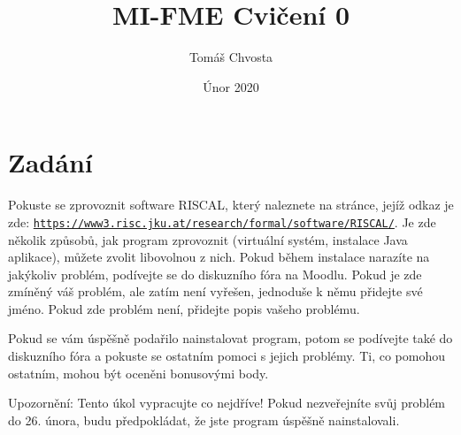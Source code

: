 \documentclass{article}
\title{MI-FME Cvičení 0}
\author{Tomáš Chvosta}
\date{Únor 2020}
\begin{document}
\maketitle

\section{Zadání}
Pokuste se zprovoznit software RISCAL, který naleznete na stránce, jejíž odkaz je zde: \href{https://www3.risc.jku.at/research/formal/software/RISCAL/}{\texttt{https://www3.risc.jku.at/research/formal/software/RISCAL/}}. Je zde několik způsobů, jak program zprovoznit (virtuální systém, instalace Java aplikace), můžete zvolit libovolnou z nich. Pokud během instalace narazíte na jakýkoliv problém, podívejte se do diskuzního fóra na Moodlu. Pokud je zde zmíněný váš problém, ale zatím není vyřešen, jednoduše k němu přidejte své jméno. Pokud zde problém není, přidejte popis vašeho problému.

Pokud se vám úspěšně podařilo nainstalovat program, potom se podívejte také do diskuzního fóra a pokuste se ostatním pomoci s jejich problémy. Ti, co pomohou ostatním, mohou být oceněni bonusovými body.

Upozornění: Tento úkol vypracujte co nejdříve! Pokud nezveřejníte svůj problém do 26. února, budu předpokládat, že jste program úspěšně nainstalovali.
\end{document}
